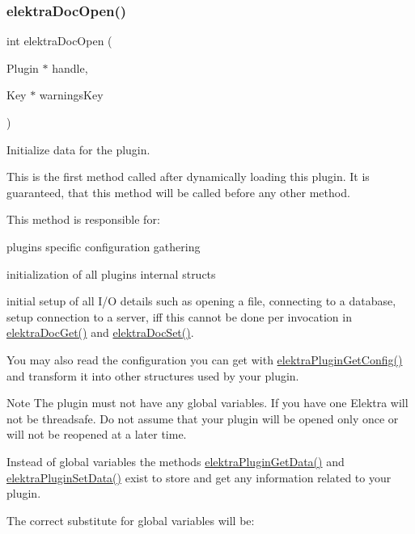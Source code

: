 \subsubsection{\texorpdfstring{elektraDocOpen()}{elektraDocOpen()}}
{\footnotesize\ttfamily int elektra\+Doc\+Open (\begin{DoxyParamCaption}\item[{Plugin $\ast$}]{handle,  }\item[{Key $\ast$}]{warnings\+Key }\end{DoxyParamCaption})}



Initialize data for the plugin. 

This is the first method called after dynamically loading this plugin. It is guaranteed, that this method will be called before any other method.

This method is responsible for\+:
\begin{DoxyItemize}
\item plugin\textquotesingle{}s specific configuration gathering
\item initialization of all plugin\textquotesingle{}s internal structs
\item initial setup of all I/O details such as opening a file, connecting to a database, setup connection to a server, iff this cannot be done per invocation in \mbox{\hyperlink{group__plugin_gacb69f3441c6d84241b4362f958fbe313}{elektra\+Doc\+Get()}} and \mbox{\hyperlink{group__plugin_gae65781a1deb34efc79c8cb9d9174842c}{elektra\+Doc\+Set()}}.
\end{DoxyItemize}

You may also read the configuration you can get with \mbox{\hyperlink{group__plugin_ga644bead796506c172817724051c977c9}{elektra\+Plugin\+Get\+Config()}} and transform it into other structures used by your plugin.

\begin{DoxyNote}{Note}
The plugin must not have any global variables. If you have one Elektra will not be threadsafe. Do not assume that your plugin will be opened only once or will not be reopened at a later time.
\end{DoxyNote}
Instead of global variables the methods \mbox{\hyperlink{group__plugin_gaafcf3216b46292f222b8cc7828b4dd20}{elektra\+Plugin\+Get\+Data()}} and \mbox{\hyperlink{group__plugin_gaf4b941a52ff55d0ca2a9158d90208ef2}{elektra\+Plugin\+Set\+Data()}} exist to store and get any information related to your plugin.

The correct substitute for global variables will be\+:


